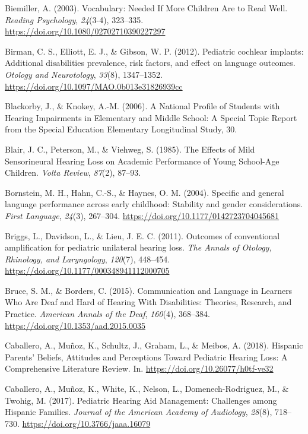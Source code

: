 \documentclass[english,man]{apa6}
\begin{document}
\leavevmode\hypertarget{ref-biemiller2003}{}%
Biemiller, A. (2003). Vocabulary: Needed If More Children Are to Read Well. \emph{Reading Psychology}, \emph{24}(3-4), 323--335. \url{https://doi.org/10.1080/02702710390227297}

\leavevmode\hypertarget{ref-birman2012}{}%
Birman, C. S., Elliott, E. J., \& Gibson, W. P. (2012). Pediatric cochlear implants: Additional disabilities prevalence, risk factors, and effect on language outcomes. \emph{Otology and Neurotology}, \emph{33}(8), 1347--1352. \url{https://doi.org/10.1097/MAO.0b013e31826939cc}

\leavevmode\hypertarget{ref-blackorby2006}{}%
Blackorby, J., \& Knokey, A.-M. (2006). A National Profile of Students with Hearing Impairments in Elementary and Middle School: A Special Topic Report from the Special Education Elementary Longitudinal Study, 30.

\leavevmode\hypertarget{ref-blair1985}{}%
Blair, J. C., Peterson, M., \& Viehweg, S. (1985). The Effects of Mild Sensorineural Hearing Loss on Academic Performance of Young School-Age Children. \emph{Volta Review}, \emph{87}(2), 87--93.

\leavevmode\hypertarget{ref-bornstein2004}{}%
Bornstein, M. H., Hahn, C.-S., \& Haynes, O. M. (2004). Specific and general language performance across early childhood: Stability and gender considerations. \emph{First Language}, \emph{24}(3), 267--304. \url{https://doi.org/10.1177/0142723704045681}

\leavevmode\hypertarget{ref-briggs2011}{}%
Briggs, L., Davidson, L., \& Lieu, J. E. C. (2011). Outcomes of conventional amplification for pediatric unilateral hearing loss. \emph{The Annals of Otology, Rhinology, and Laryngology}, \emph{120}(7), 448--454. \url{https://doi.org/10.1177/000348941112000705}

\leavevmode\hypertarget{ref-bruce2015}{}%
Bruce, S. M., \& Borders, C. (2015). Communication and Language in Learners Who Are Deaf and Hard of Hearing With Disabilities: Theories, Research, and Practice. \emph{American Annals of the Deaf}, \emph{160}(4), 368--384. \url{https://doi.org/10.1353/aad.2015.0035}

\leavevmode\hypertarget{ref-caballero2018}{}%
Caballero, A., Muñoz, K., Schultz, J., Graham, L., \& Meibos, A. (2018). Hispanic Parents' Beliefs, Attitudes and Perceptions Toward Pediatric Hearing Loss: A Comprehensive Literature Review. In. \url{https://doi.org/10.26077/h0tf-ve32}

\leavevmode\hypertarget{ref-caballero2017}{}%
Caballero, A., Muñoz, K., White, K., Nelson, L., Domenech-Rodriguez, M., \& Twohig, M. (2017). Pediatric Hearing Aid Management: Challenges among Hispanic Families. \emph{Journal of the American Academy of Audiology}, \emph{28}(8), 718--730. \url{https://doi.org/10.3766/jaaa.16079}
\end{document}
